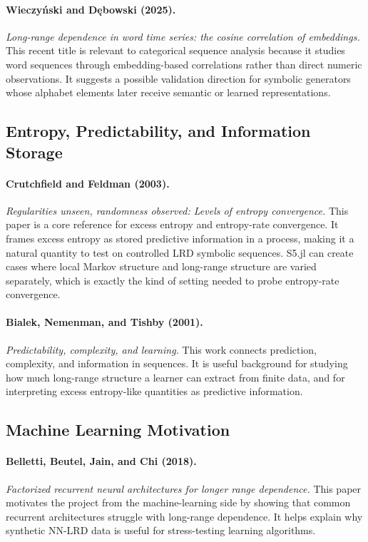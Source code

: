 \documentclass[11pt]{article}
\begin{document}
\paragraph{Wieczyński and Dębowski (2025).}
\emph{Long-range dependence in word time series: the cosine correlation of
embeddings.}
This recent title is relevant to categorical sequence analysis because it
studies word sequences through embedding-based correlations rather than direct
numeric observations. It suggests a possible validation direction for symbolic
generators whose alphabet elements later receive semantic or learned
representations.

\subsection{Entropy, Predictability, and Information Storage}

\paragraph{Crutchfield and Feldman (2003).}
\emph{Regularities unseen, randomness observed: Levels of entropy convergence.}
This paper is a core reference for excess entropy and entropy-rate convergence.
It frames excess entropy as stored predictive information in a process, making it
a natural quantity to test on controlled LRD symbolic sequences. S5.jl can create
cases where local Markov structure and long-range structure are varied
separately, which is exactly the kind of setting needed to probe entropy-rate
convergence.

\paragraph{Bialek, Nemenman, and Tishby (2001).}
\emph{Predictability, complexity, and learning.}
This work connects prediction, complexity, and information in sequences. It is
useful background for studying how much long-range structure a learner can
extract from finite data, and for interpreting excess entropy-like quantities as
predictive information.

\subsection{Machine Learning Motivation}

\paragraph{Belletti, Beutel, Jain, and Chi (2018).}
\emph{Factorized recurrent neural architectures for longer range dependence.}
This paper motivates the project from the machine-learning side by showing that
common recurrent architectures struggle with long-range dependence. It helps
explain why synthetic NN-LRD data is useful for stress-testing learning
algorithms.
\end{document}
